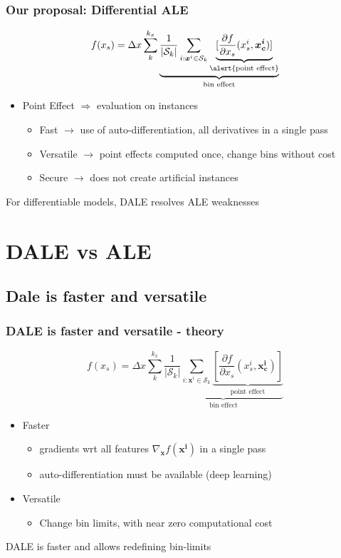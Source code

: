 \documentclass{beamer}
\newcommand{\xb}{\boldsymbol{x}}
\begin{document}
\begin{frame}
  \frametitle{Our proposal: Differential ALE}
    \[f(x_s) = \Delta x \sum_k^{k_x} \underbrace{\frac{1}{|\mathcal{S}_k|} \sum_{i:\xb^i \in \mathcal{S}_k} \underbrace{[\frac{\partial f}{\partial x_s}(x_s^i, \bm{x^i_c})]}_{\text{\alert{point effect}}}}_{\text{bin effect}} \]

    \begin{itemize}
      \item Point Effect \(\Rightarrow\) evaluation \alert{on instances}
    \begin{itemize}
    \item Fast \( \rightarrow \) use of auto-differentiation, all derivatives in a single pass
    \item Versatile \( \rightarrow\) point effects computed once, change bins without cost
    \item Secure \( \rightarrow\) does not create artificial instances
    \end{itemize}
    \end{itemize}

  \noindent\makebox[\linewidth]{\rule{\paperwidth}{0.4pt}}
  For \alert{differentiable} models, DALE resolves ALE weaknesses
\end{frame}



\section{DALE vs ALE}

\subsection{Dale is faster and versatile}

\begin{frame}
  \frametitle{DALE is faster and versatile - theory}
    \[f(x_s) = \Delta x \sum_k^{k_x} \underbrace{\frac{1}{|\mathcal{S}_k|} \sum_{i:\xb^i \in \mathcal{S}_k} \underbrace{[\frac{\partial f}{\partial x_s}(x_s^i, \bm{x^i_c})]}_{\text{point effect}}}_{\text{bin effect}} \]

  \begin{itemize}
  \item Faster
    \begin{itemize}
      \item gradients wrt all features \(\nabla_{\bm{x}} f(\bm{x^i})\) in a single pass
      \item auto-differentiation must be available (deep learning)
    \end{itemize}
  \item Versatile
    \begin{itemize}
    \item Change bin limits, with near zero computational cost
    \end{itemize}

  \end{itemize}
  \noindent\makebox[\linewidth]{\rule{\paperwidth}{0.4pt}}
  DALE is faster and allows redefining bin-limits
\end{frame}
\end{document}
